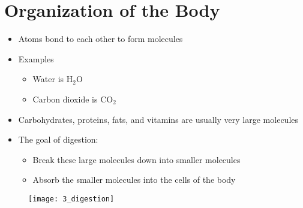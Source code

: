 \documentclass[title={Chapter 3}]{fdsn201notes}
\begin{document}

\section{Organization of the Body}\label{sec:organization-of-the-body}
\begin{itemize}
	\item Atoms bond to each other to form molecules
\end{itemize}
\begin{itemize}
	\item Examples
	\begin{itemize}
		\item Water is $\mbox{H}_{2}\mbox{O}$
		\item Carbon dioxide is $\mbox{CO}_{2}$
	\end{itemize}
	\item Carbohydrates, proteins, fats, and vitamins are usually very large molecules
	\item The goal of digestion:
	\begin{itemize}
		\item Break these large molecules down into smaller molecules
		\item Absorb the smaller molecules into the cells of the body
	\end{itemize}
\end{itemize}

\begin{figure}[H]
	\centering
	\texttt{[image: 3\_digestion]}
	\caption{}
	\label{fig:3_digestion}
\end{figure}
\end{document}
